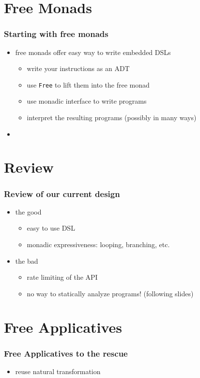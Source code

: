 \documentclass[compress]{beamer}
\begin{document}
\section{Free Monads}
\label{sec:free-monads}

\begin{frame}
  \frametitle{Starting with free monads}
  \begin{itemize}
  \item free monads offer easy way to write embedded DSLs
    \begin{itemize}
    \item write your instructions as an ADT
    \item use \texttt{Free} to lift them into the free monad
    \item use monadic interface to write programs
    \item interpret the resulting programs (possibly in many ways)
    \end{itemize}
  \item
  \end{itemize}
\end{frame}

\section{Review}
\label{sec:review}

\begin{frame}
  \frametitle{Review of our current design}
  \begin{itemize}
  \item the good
    \begin{itemize}
    \item easy to use DSL
    \item monadic expressiveness: looping, branching, etc.
    \end{itemize}
  \item the bad
    \begin{itemize}
    \item rate limiting of the API
    \item no way to statically analyze programs! (following slides)
    \end{itemize}
  \end{itemize}
\end{frame}

\section{Free Applicatives}
\label{sec:free-applicatives}



\begin{frame}
  \frametitle{Free Applicatives to the rescue}
  \begin{itemize}
  \item reuse natural transformation
  \end{itemize}
\end{frame}
\end{document}
